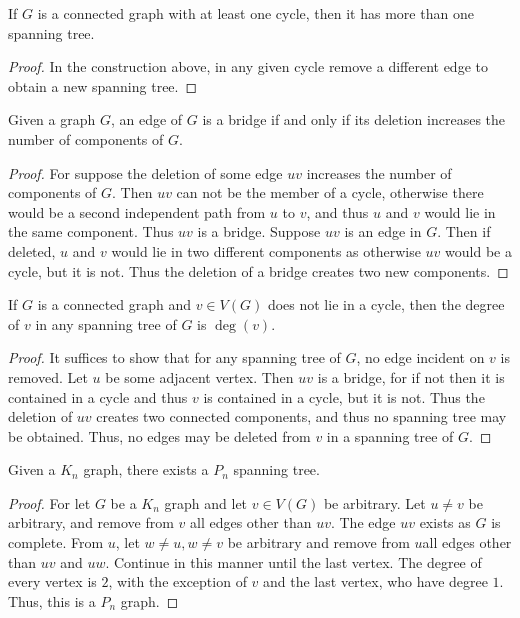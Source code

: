         \begin{theorem}
        If $G$ is a connected graph with at least one cycle, then it has more than one spanning tree.
        \end{theorem}
        \begin{proof}
        In the construction above, in any given cycle remove a different edge to obtain a new spanning tree.
        \end{proof}
        \begin{theorem}
        Given a graph $G$, an edge of $G$ is a bridge if and only if its deletion increases the number of components of $G$.
        \end{theorem}
        \begin{proof}
        For suppose the deletion of some edge $uv$ increases the number of components of $G$. Then $uv$ can not be the member of a cycle, otherwise there would be a second independent path from $u$ to $v$, and thus $u$ and $v$ would lie in the same component. Thus $uv$ is a bridge. Suppose $uv$ is an edge in $G$. Then if deleted, $u$ and $v$ would lie in two different components as otherwise $uv$ would be a cycle, but it is not. Thus the deletion of a bridge creates two new components.
        \end{proof}
        \begin{theorem}
        If $G$ is a connected graph and $v\in V(G)$ does not lie in a cycle, then the degree of $v$ in any spanning tree of $G$ is $\deg(v)$.
        \end{theorem}
        \begin{proof}
        It suffices to show that for any spanning tree of $G$, no edge incident on $v$ is removed. Let $u$ be some adjacent vertex. Then $uv$ is a bridge, for if not then it is contained in a cycle and thus $v$ is contained in a cycle, but it is not. Thus the deletion of $uv$ creates two connected components, and thus no spanning tree may be obtained. Thus, no edges may be deleted from $v$ in a spanning tree of $G$.
        \end{proof}
        \begin{theorem}
        Given a $K_n$ graph, there exists a $P_n$ spanning tree.
        \end{theorem}
        \begin{proof}
        For let $G$ be a $K_n$ graph and let $v\in V(G)$ be arbitrary. Let $u\ne v$ be arbitrary, and remove from $v$ all edges other than $uv$. The edge $uv$ exists as $G$ is complete. From $u$, let $w\ne u, w\ne v$ be arbitrary and remove from $u$all edges other than $uv$ and $uw$. Continue in this manner until the last vertex. The degree of every vertex is $2$, with the exception of $v$ and the last vertex, who have degree $1$. Thus, this is a $P_n$ graph.
        \end{proof}
